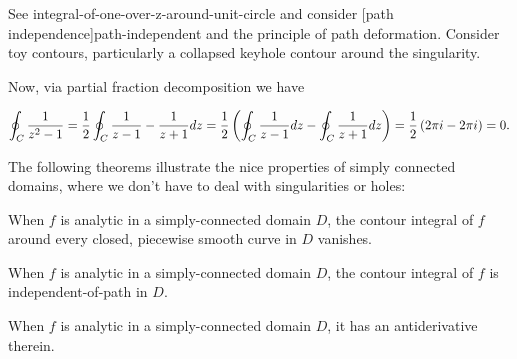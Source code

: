\documentclass{article}
\begin{document}
\begin{intuition}
See \@{integral-of-one-over-z-around-unit-circle} and consider \@[path independence]{path-independent} and the principle of path deformation. Consider toy contours, particularly a collapsed keyhole contour around the singularity.
\end{intuition}

Now, via partial fraction decomposition we have

\[ \oint_C \frac{1}{z^2 - 1} = \frac{1}{2} \oint_C \frac{1}{z-1} - \frac{1}{z+1} dz = \frac{1}{2}\left(\oint_C \frac{1}{z - 1} dz - \oint_C \frac{1}{z + 1}dz\right) = \frac{1}{2} \left(2 \pi i - 2 \pi i\right) = 0. \] 

The following theorems illustrate the nice properties of simply connected \@{domains}, where we don't have to deal with singularities or holes:

When $f$ is analytic in a simply-connected domain $D$, the contour integral of $f$ around every closed, piecewise smooth curve in $D$ vanishes.

When $f$ is analytic in a simply-connected domain $D$, the contour integral of $f$ is \@{independent-of-path} in $D$.

When $f$ is analytic in a simply-connected domain $D$, it has an antiderivative therein.
\end{document}
